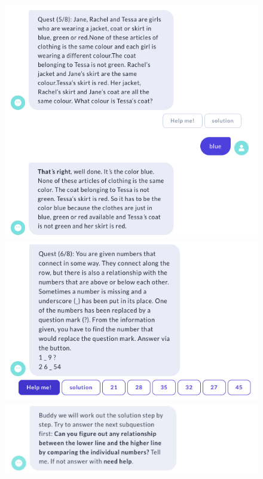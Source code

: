 \begin{figure}[H]
  \centering


  \includegraphics[width=0.7\linewidth]{images/VickyQuiz/Q7.png}
  \includegraphics[width=0.7\linewidth]{images/VickyQuiz/Q8.png}
  \includegraphics[width=0.7\linewidth]{images/VickyQuiz/Q8.1.png}

  \label{fig:Game_III}
\end{figure} 
